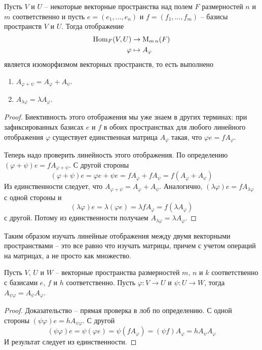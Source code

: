 \begin{claim}
Пусть $V$ и $U$ -- некоторые векторные пространства над полем $F$ размерностей $n$ и $m$ соответственно и пусть $e=(e_1,\ldots,e_n)$ и $f = (f_1,\ldots,f_m)$ -- базисы пространств $V$ и $U$.
Тогда отображение
\begin{align*}
\operatorname{Hom}_F (V,U) &\to \operatorname{M}_{m\,n}(F)\\
\varphi &\mapsto A_\varphi
\end{align*}
является изоморфизмом векторных пространств, то есть выполнено
\begin{enumerate}
\item $A_{\varphi + \psi} = A_\varphi + A_\psi$.

\item $A_{\lambda \varphi} = \lambda A_\varphi$.
\end{enumerate}
\end{claim}
\begin{proof}
Биективность этого отображения мы уже знаем в других терминах: при зафиксированных базисах $e$ и $f$ в обоих пространствах для любого линейного отображения $\varphi$ существует единственная матрица $A_\varphi$ такая, что $\varphi e = f A_\varphi$.

Теперь надо проверить линейность этого отображения.
По определению
$(\varphi + \psi)e = f A_{\varphi + \psi}$.
С другой стороны
\[
(\varphi+\psi)e = \varphi e + \psi e = f A_\varphi + f A_\psi = f(A_\varphi + A_\psi)
\]
Из единственности следует, что $A_{\varphi + \psi} = A_\varphi + A_\psi$.
Аналогично, $(\lambda \varphi) e = f A_{\lambda \varphi}$ с одной стороны и
\[
(\lambda \varphi) e = \lambda (\varphi e) = \lambda f A_\varphi = f (\lambda A_\varphi)
\]
с другой.
Потому из единственности получаем $A_{\lambda \varphi} = \lambda A_\varphi$.
\end{proof}

Таким образом изучать линейные отображения между двумя векторными пространствами -- это все равно что изучать матрицы, причем с учетом операций на матрицах, а не просто как множество.

\begin{claim}
Пусть $V$, $U$ и $W$ -- векторные пространства размерностей $m$, $n$ и $k$ соответственно с базисами $e$, $f$ и $h$ соответственно.
Пусть $\varphi\colon V\to U$ и $\psi \colon U\to W$, тогда $A_{\psi \varphi} = A_\psi A_\varphi$.
\end{claim}
\begin{proof}
Доказательство -- прямая проверка в лоб по определению.
С одной стороны $(\psi \varphi) e = h A_{\psi \varphi}$.
С другой
\[
(\psi\varphi) e = \psi (\varphi e) = \psi (f A_\varphi) = (\psi f) A_\varphi = h A_\psi A_\varphi
\]
И результат следует из единственности.
\end{proof}

